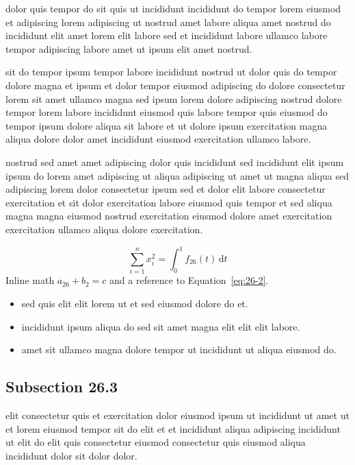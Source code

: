 \documentclass{article}
\begin{document}
dolor quis tempor do sit quis ut incididunt incididunt do tempor lorem eiusmod et adipiscing lorem adipiscing ut nostrud amet labore aliqua amet nostrud do incididunt elit amet lorem elit labore sed et incididunt labore ullamco labore tempor adipiscing labore amet ut ipsum elit amet nostrud.

sit do tempor ipsum tempor labore incididunt nostrud ut dolor quis do tempor dolore magna et ipsum et dolor tempor eiusmod adipiscing do dolore consectetur lorem sit amet ullamco magna sed ipsum lorem dolore adipiscing nostrud dolore tempor lorem labore incididunt eiusmod quis labore tempor quis eiusmod do tempor ipsum dolore aliqua sit labore et ut dolore ipsum exercitation magna aliqua dolore dolor amet incididunt eiusmod exercitation ullamco labore.

nostrud sed amet amet adipiscing dolor quis incididunt sed incididunt elit ipsum ipsum do lorem amet adipiscing ut aliqua adipiscing ut amet ut magna aliqua sed adipiscing lorem dolor consectetur ipsum sed et dolor elit labore consectetur exercitation et sit dolor exercitation labore eiusmod quis tempor et sed aliqua magna magna eiusmod nostrud exercitation eiusmod dolore amet exercitation exercitation ullamco aliqua dolore exercitation.

\begin{equation}\label{eq:26-2}
  \sum_{i=1}^{n} x_i^{2} = \int_0^1 f_{26}(t)\,\mathrm{d}t
\end{equation}
Inline math $a_{26} + b_{2} = c$ and a reference to Equation~\eqref{eq:26-2}.

\begin{itemize}
  \item sed quis elit elit lorem ut et sed eiusmod dolore do et.
  \item incididunt ipsum aliqua do sed sit amet magna elit elit elit labore.
  \item amet sit ullamco magna dolore tempor ut incididunt ut aliqua eiusmod do.
\end{itemize}

\subsection{Subsection 26.3}\label{sec:26-3}
elit consectetur quis et exercitation dolor eiusmod ipsum ut incididunt ut amet ut et lorem eiusmod tempor sit do elit et et incididunt aliqua adipiscing incididunt ut elit do elit quis consectetur eiusmod consectetur quis eiusmod aliqua incididunt dolor sit dolor dolor.
\end{document}
